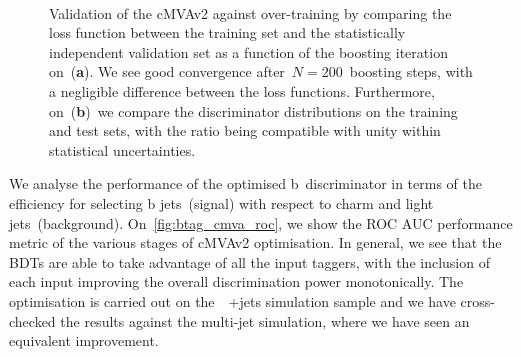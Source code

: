 \begin{figure}
\begin{centering}
 \\
\caption[The cMVAv2 BDT loss as a function of boosting iteration]{Validation of the cMVAv2 against over-training by comparing the loss function between the training set and the statistically independent validation set as a function of the boosting iteration on~(\textbf{a}). We see good convergence after~$N=200$~boosting steps, with a negligible difference between the loss functions. Furthermore, on~(\textbf{b})~we compare the discriminator distributions on the training and test sets, with the ratio being compatible with unity within statistical uncertainties.}
\label{fig:btag_loss}
\end{centering}
\end{figure}

We analyse the performance of the optimised b~discriminator in terms of the efficiency for selecting b jets~(signal) with respect to charm and light jets~(background). On~\cref{fig:btag_cmva_roc}, we show the ROC AUC performance metric of the various stages of cMVAv2 optimisation. In general, we see that the BDTs are able to take advantage of all the input taggers, with the inclusion of each input improving the overall discrimination power monotonically. The optimisation is carried out on the~\ttbar~+jets simulation sample and we have cross-checked the results against the multi-jet simulation, where we have seen an equivalent improvement.

